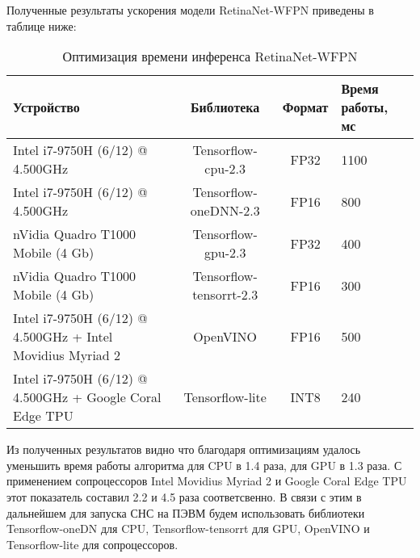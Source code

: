 Полученные результаты ускорения модели RetinaNet-WFPN приведены в таблице ниже:

\begin{table}[H]
    \caption{Оптимизация времени инференса RetinaNet-WFPN}\label{leaderboard-full}
    \begin{tabular}{|p{6cm}|c|c|p{2cm}|}
        \hline
        {Устройство} & {Библиотека} & {Формат} & {Время работы, мс} \\
        \hline
        Intel i7-9750H (6/12) @ 4.500GHz & Tensorflow-cpu-2.3 & FP32 & 1100 \\
        \hline
        Intel i7-9750H (6/12) @ 4.500GHz & Tensorflow-oneDNN-2.3 & FP16 & 800 \\
        \hline
        nVidia Quadro T1000 Mobile (4 Gb) & Tensorflow-gpu-2.3 & FP32 & 400 \\
        \hline
        nVidia Quadro T1000 Mobile (4 Gb) & Tensorflow-tensorrt-2.3 & FP16 & 300 \\
        \hline
        Intel i7-9750H (6/12) @ 4.500GHz + Intel Movidius Myriad 2 & OpenVINO & FP16 & 500 \\
        \hline
        Intel i7-9750H (6/12) @ 4.500GHz + Google Coral Edge TPU & Tensorflow-lite & INT8 & 240 \\
        \hline
    \end{tabular}
\end{table}

Из полученных результатов видно что благодаря оптимизациям удалось уменьшить время работы алгоритма для CPU в 1.4 раза, для GPU в 1.3 раза. С применением сопроцессоров Intel Movidius Myriad 2 и Google Coral Edge TPU этот показатель составил 2.2 и 4.5 раза соответсвенно. В связи с этим в дальнейшем для запуска СНС на ПЭВМ будем использовать библиотеки Tensorflow-oneDN для CPU, Tensorflow-tensorrt для GPU, OpenVINO и Tensorflow-lite для сопроцессоров.

